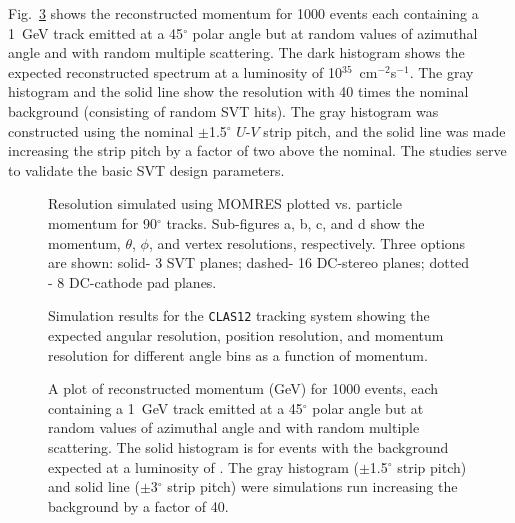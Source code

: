 Fig.~\ref{resplot} shows the reconstructed momentum for 1000 events
each containing a 1~GeV track emitted at a 45$^{\circ}$ polar angle
but at random values of azimuthal angle and with random multiple
scattering.  The dark histogram shows the expected reconstructed
spectrum at a luminosity of 10$^{35}$~cm$^{-2}$s$^{-1}$.  The gray
histogram and the solid line show the resolution with 40 times the
nominal background (consisting of random SVT hits).  The gray histogram
was constructed using the nominal $\pm$1.5$^{\circ}$ $U$-$V$ strip
pitch, and the solid line was made increasing the strip pitch by a
factor of two above the nominal.  The studies serve to validate the
basic SVT design parameters.

\begin{figure}[htbp]
\vspace{8.0cm}
\caption{\small{Resolution simulated using MOMRES plotted vs. particle 
momentum for 90$^{\circ}$ tracks.  Sub-figures a, b, c, and d show the 
momentum, $\theta$, $\phi$, and vertex resolutions, respectively.  Three 
options are shown: solid- 3 SVT planes; dashed- 16 DC-stereo planes; 
dotted - 8 DC-cathode pad planes.}}
\label{90degres}
\end{figure}

\begin{figure}[htbp]
\vspace{12.0cm}
\caption{\small{Simulation results for the {\tt CLAS12} tracking system
showing the expected angular resolution, position resolution, and
momentum resolution for different angle bins as a function of momentum.}
\label{resol}}
\end{figure}

\begin{figure}[htpb]
\vspace{6.5cm}
\caption{\small{A plot of reconstructed momentum (GeV) for 1000 events,
each containing a 1~GeV track emitted at a 45$^{\circ}$ polar angle
but at random values of azimuthal angle and with random multiple
scattering.  The solid histogram is for events with the background 
expected at a luminosity of .  The gray histogram ($\pm$1.5$^{\circ}$
strip pitch) and solid line ($\pm$3$^{\circ}$ strip pitch) were
simulations run increasing the background by a factor of 40.}}
\label{resplot}
\end{figure}


